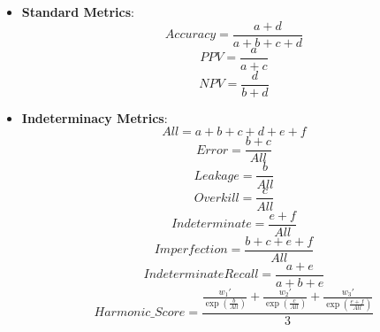 \begin{itemize}
  \item \textbf{Standard Metrics}: 
    \begin{equation}
        Accuracy = \frac{a + d}{a + b + c + d}
    \end{equation}
    \begin{equation}
        PPV = \frac{a}{a + c}
    \end{equation}
    \begin{equation}
        NPV = \frac{d}{b + d}
    \end{equation}
  \item \textbf{Indeterminacy Metrics}: 
    \begin{equation}
        All = a + b + c + d + e + f
    \end{equation}
    \begin{equation}
        Error = \frac{b + c}{All}
    \end{equation}
    \begin{equation}
        Leakage = \frac{b}{All}
    \end{equation}
    \begin{equation}
        Overkill = \frac{c}{All}
    \end{equation}
    \begin{equation}
        Indeterminate = \frac{e + f}{All}
    \end{equation}
    \begin{equation}
        Imperfection = \frac{b + c + e + f}{All}
    \end{equation}
    \begin{equation}
        Indeterminate Recall = \frac{a + e}{a + b + e}
    \end{equation}
    \begin{equation}
        Harmonic\_Score = \frac{\frac{w_1'}{\exp\left(\frac{b}{All}\right)} + \frac{w_2'}{\exp\left(\frac{c}{All}\right)} + \frac{w_3'}{\exp\left(\frac{e + f}{All}\right)}}{3}
    \end{equation}
\end{itemize}


